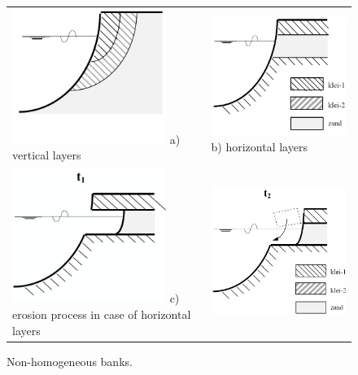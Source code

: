 \begin{figure}
\begin{tabular}{p{6cm}p{6cm}}
\includegraphics[width=5cm]{figures/Fig4-8a.png} \linebreak
a) vertical layers &
\includegraphics[width=5cm]{figures/Fig4-8b.png} \linebreak
b) horizontal layers \\
\includegraphics[width=5cm]{figures/Fig4-8c.png} \linebreak
c) erosion process in case of horizontal layers &
\includegraphics[width=5cm]{figures/Fig4-8d.png} \\
\end{tabular}
\caption{Non-homogeneous banks.}
\label{Fig4.8}
\end{figure}

